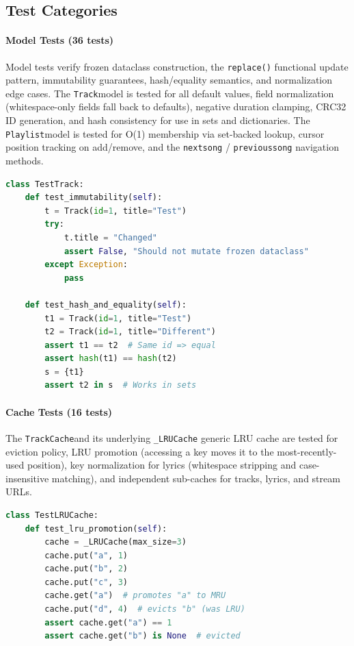 \documentclass[a4paper,11pt,twoside]{article}
\newcommand{\track}{\texttt{Track}}
\newcommand{\playlist}{\texttt{Playlist}}
\newcommand{\trackcache}{\texttt{TrackCache}}
\DeclareRobustCommand{\method}[1]{\texttt{\def\_{\textunderscore\allowbreak}#1}}
\begin{document}
\subsection{Test Categories}

\paragraph{Model Tests (36 tests)}
Model tests verify frozen dataclass construction, the \method{replace()}
functional update pattern, immutability guarantees, hash/equality semantics,
and normalization edge cases. The \track model is tested for all default
values, field normalization (whitespace-only fields fall back to defaults),
negative duration clamping, CRC32 ID generation, and hash consistency for use
in sets and dictionaries. The \playlist model is tested for O(1) membership
via set-backed lookup, cursor position tracking on add/remove, and the
\method{next\_song} / \method{previous\_song} navigation methods.

\begin{lstlisting}[language=Python, caption={Immutability test for frozen dataclass.}]
class TestTrack:
    def test_immutability(self):
        t = Track(id=1, title="Test")
        try:
            t.title = "Changed"
            assert False, "Should not mutate frozen dataclass"
        except Exception:
            pass

    def test_hash_and_equality(self):
        t1 = Track(id=1, title="Test")
        t2 = Track(id=1, title="Different")
        assert t1 == t2  # Same id => equal
        assert hash(t1) == hash(t2)
        s = {t1}
        assert t2 in s  # Works in sets
\end{lstlisting}

\paragraph{Cache Tests (16 tests)}
The \trackcache and its underlying \texttt{\_LRUCache} generic LRU cache are
tested for eviction policy, LRU promotion (accessing a key moves it to the
most-recently-used position), key normalization for lyrics (whitespace
stripping and case-insensitive matching), and independent sub-caches for
tracks, lyrics, and stream URLs.

\begin{lstlisting}[language=Python, caption={LRU promotion test.}]
class TestLRUCache:
    def test_lru_promotion(self):
        cache = _LRUCache(max_size=3)
        cache.put("a", 1)
        cache.put("b", 2)
        cache.put("c", 3)
        cache.get("a")  # promotes "a" to MRU
        cache.put("d", 4)  # evicts "b" (was LRU)
        assert cache.get("a") == 1
        assert cache.get("b") is None  # evicted
\end{lstlisting}
\end{document}
